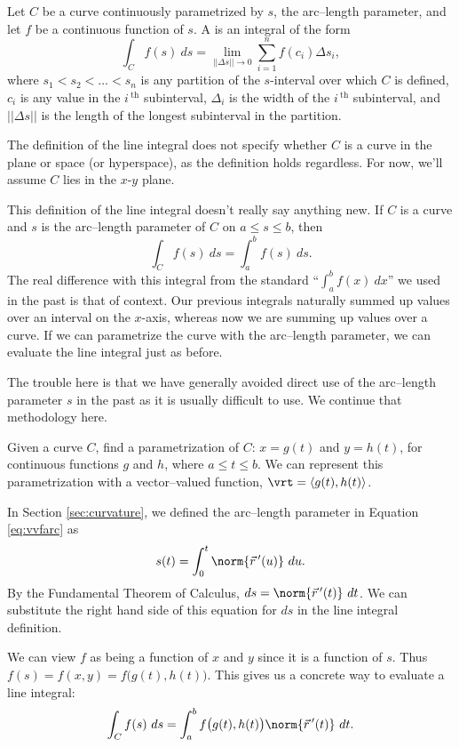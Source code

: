 {Let $C$ be a curve continuously parametrized by $s$, the arc--length parameter, and let $f$ be a continuous function of $s$. A  is an integral of the form
$$\int_C f(s)\ ds = \lim_{||\Delta s||\to 0}\sum_{i=1}^n f(c_i)\Delta s_i,$$
where $s_1<s_2<\ldots<s_n$ is any partition of the $s$-interval over which $C$ is defined, $c_i$ is any value in the $i\,^\text{th}$ subinterval,  $\Delta_i$ is the width of the $i\,^\text{th}$ subinterval, and $||\Delta s||$ is the length of the longest subinterval in the partition.
}

The definition of the line integral does not specify whether $C$ is a curve in the plane or space (or hyperspace), as the definition holds regardless. For now, we'll assume $C$ lies in the $x$-$y$ plane.

This definition of the line integral  doesn't really say anything new. If $C$ is a curve and $s$ is the arc--length parameter of $C$ on $a\leq s\leq b$, then 
$$\int_Cf(s)\ ds = \int_a^bf(s)\ ds.$$
The real difference with this integral from the standard ``$\int_a^bf(x)\ dx$'' we used in the past is that of context. Our previous integrals naturally summed up values over an interval on the $x$-axis, whereas now we are summing up values over a curve. If we can parametrize the curve with the arc--length parameter, we can evaluate the line integral just as before.

The trouble here is that we have generally avoided direct use of the arc--length parameter $s$ in the past as it is usually difficult to use. We continue that methodology here. 

Given a curve $C$, find a parametrization of $C$: $x = g(t)$ and $y=h(t)$, for continuous functions $g$ and $h$, where $a\leq t\leq b$. We can represent this parametrization with a vector--valued function, $\vrt = \langle g(t),h(t)\rangle$.

In Section \ref{sec:curvature}, we defined the arc--length parameter in Equation \ref{eq:vvfarc} as 
$$
s(t) = \int_0^t \norm{\vec r\,'(u)}\ du. 
$$
By the Fundamental Theorem of Calculus, $ds = \norm{\vec r\,'(t)}\ dt$. We can substitute the right hand side of this equation for $ds$ in the line integral definition.

We can view $f$ as being a function of $x$ and $y$ since it is a function of $s$. Thus $f(s) =f(x,y) =f\big(g(t),h(t)\big)$. This gives us a concrete way to evaluate a line integral:
$$\int_C f(s)\ ds = \int_a^bf\big(g(t),h(t)\big)\norm{\vec r\,'(t)}\ dt.$$

